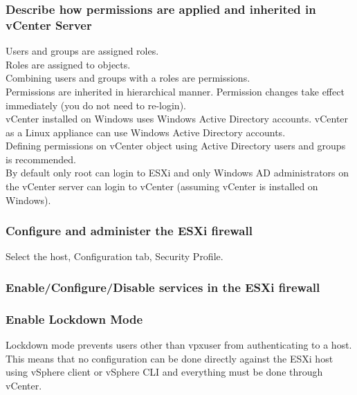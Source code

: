 \subsubsection{Describe how permissions are applied and inherited in vCenter Server}

Users and groups are assigned roles.\\

Roles are assigned to objects.\\

Combining users and groups with a roles are permissions.\\

Permissions are inherited in hierarchical manner. Permission changes take
effect immediately (you do not need to re-login).\\

vCenter installed on Windows uses Windows Active Directory accounts. vCenter
as a Linux appliance can use Windows Active Directory accounts.\\

Defining permissions on vCenter object using Active Directory users and groups
is recommended.\\

By default only root can login to ESXi and only Windows AD administrators on
the vCenter server can login to vCenter (assuming vCenter is installed on
Windows).\\

\subsubsection{Configure and administer the ESXi firewall}

Select the host, Configuration tab, Security Profile.

\subsubsection{Enable/Configure/Disable services in the ESXi firewall}

\subsubsection{Enable Lockdown Mode}

Lockdown mode prevents users other than vpxuser from authenticating to a host.
This means that no configuration can be done directly against the ESXi host
using vSphere client or vSphere CLI and everything must be done through
vCenter.\\

